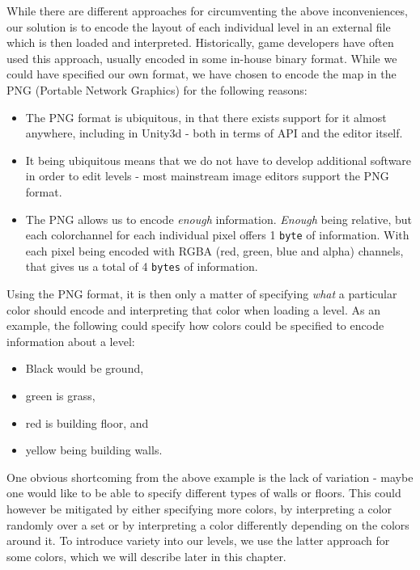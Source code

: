 While there are different approaches for circumventing the above
inconveniences, our solution is to encode the layout of each individual level
in an external file which is then loaded and interpreted. Historically, game
developers have often used this approach, usually encoded in some in-house
binary format. While we could have specified our own format, we have chosen to
encode the map in the PNG (Portable Network Graphics) for the following
reasons:
\begin{itemize}
    \item The PNG format is ubiquitous, in that there exists support for it
        almost anywhere, including in Unity3d - both in terms of API and the
        editor itself.
    \item It being ubiquitous means that we do not have to develop additional
        software in order to edit levels - most mainstream image editors
        support the PNG format.
    \item The PNG allows us to encode \textit{enough} information.
        \textit{Enough} being relative, but each colorchannel for each
        individual pixel offers 1 \texttt{byte} of information. With each pixel
        being encoded with RGBA (red, green, blue and alpha) channels, that
        gives us a total of 4 \texttt{bytes} of information.
\end{itemize}

Using the PNG format, it is then only a matter of specifying \textit{what} a
particular color should encode and interpreting that color when loading a
level. As an example, the following could specify how colors could be specified
to encode information about a level:
\begin{itemize}
    \item Black would be ground,
    \item green is grass,
    \item red is building floor, and
    \item yellow being building walls.
\end{itemize}

One obvious shortcoming from the above example is the lack of variation - maybe
one would like to be able to specify different types of walls or floors. This
could however be mitigated by either specifying more colors, by interpreting a
color randomly over a set or by interpreting a color differently depending on
the colors around it. To introduce variety into our levels, we use the latter
approach for some colors, which we will describe later in this chapter.
\\


